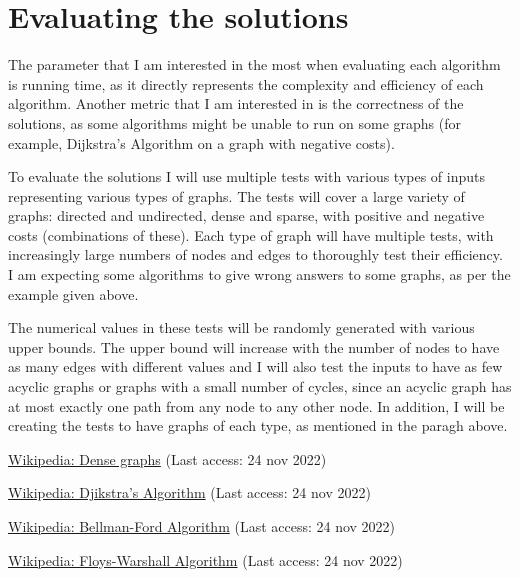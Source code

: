 \documentclass[runningheads]{llncs}
\begin{document}
\section{Evaluating the solutions}
The parameter that I am interested in the most when evaluating each algorithm is running time, as it directly represents the complexity and efficiency of each algorithm. Another metric that I am interested in is the correctness of the solutions, as some algorithms might be unable to run on some graphs (for example, Dijkstra's Algorithm on a graph with negative costs).

To evaluate the solutions I will use multiple tests with various types of inputs representing various types of graphs. The tests will cover a large variety of graphs: directed and undirected, dense and sparse, with positive and negative costs (combinations of these). Each type of graph will have multiple tests, with increasingly large numbers of nodes and edges to thoroughly test their efficiency. I am expecting some algorithms to give wrong answers to some graphs, as per the example given above.

The numerical values in these tests will be randomly generated with various upper bounds. The upper bound will increase with the number of nodes to have as many edges with different values and I will also test the inputs to have as few acyclic graphs or graphs with a small number of cycles, since an acyclic graph has at most exactly one path from any node to any other node. In addition, I will be creating the tests to have graphs of each type, as mentioned in the paragh above.

%


% 
\begin{thebibliography}{8}
\href{https://en.wikipedia.org/wiki/Dense_graph}{Wikipedia: Dense graphs} (Last access: 24 nov 2022)

\href{https://en.wikipedia.org/wiki/Dijkstra\%27s_algorithm}{Wikipedia: Djikstra's Algorithm} (Last access: 24 nov 2022)

\href{https://en.wikipedia.org/wiki/Bellman\%E2\%80\%93Ford_algorithm}{Wikipedia: Bellman-Ford Algorithm} (Last access: 24 nov 2022)

\href{https://en.wikipedia.org/wiki/Floyd\%E2\%80\%93Warshall_algorithm}{Wikipedia: Floys-Warshall Algorithm} (Last access: 24 nov 2022)
\end{thebibliography}
\end{document}

